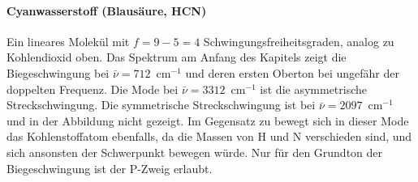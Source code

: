 \paragraph{Cyanwasserstoff (Blausäure, HCN)}  Ein lineares Molekül mit $f=9 - 5 = 4$ Schwingungsfreiheitsgraden, analog zu Kohlendioxid oben. Das Spektrum am Anfang des Kapitels zeigt die Biegeschwingung bei $\bar{\nu} = 712$~cm$^{-1}$ und deren ersten Oberton bei ungefähr der doppelten Frequenz. Die Mode bei  $\bar{\nu} = 3312$~cm$^{-1}$ ist die  asymmetrische Streckschwingung. Die symmetrische Streckschwingung ist bei $\bar{\nu} = 2097$~cm$^{-1}$ und in der Abbildung nicht gezeigt. Im Gegensatz zu  bewegt sich in dieser Mode das Kohlenstoffatom ebenfalls, da die Massen von H und N verschieden sind, und sich ansonsten der  Schwerpunkt bewegen würde. Nur für den Grundton der Biegeschwingung ist der P-Zweig erlaubt.
\begin{marginfigure}
\end{marginfigure}
\begin{marginfigure}
\end{marginfigure}



\printbibliography[segment=\therefsegment,heading=subbibliography]
